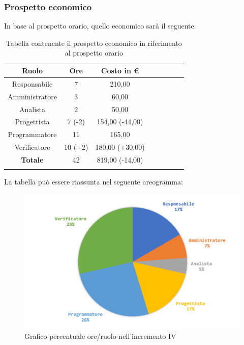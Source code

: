 		\subsubsection{Prospetto economico}
			In base al prospetto orario, quello economico sarà il seguente: 
			
			\begin{longtable}{|c|c|c|c|c|c|c|c}
				\hline
				\rowcolor{lighter-grayer}
				\textbf{Ruolo} & \textbf{Ore} & \textbf{Costo in €} \\
				\hline
				\endfirsthead
				\hline
			Responsabile 	    & 7 & 210,00\\
			\hline 
			\hline
			Amministratore	  & 3 & 60,00\\
			\hline
			\hline
			Analista 				& 2 & 50,00\\
			\hline
			\hline
			Progettista 		  & 7 (-2) & 154,00 (-44,00)\\
			\hline
			\hline
			Programmatore 	 & 11 & 165,00\\
			\hline
			\hline
			Verificatore 		  & 10 (+2) & 180,00 (+30,00) \\
			\hline
			\textbf{Totale} 	& 42 & 819,00 (-14,00)\\
			\hline
				
				\caption{Tabella contenente il prospetto economico in riferimento al prospetto orario}
			\end{longtable}
			
			La tabella può essere riassunta nel seguente areogramma:
			\begin{figure}[H]
				\centering
				\includegraphics[width=0.8\linewidth]{images/consuntivo/ConsIncr4-2.png}
				\caption{Grafico percentuale ore/ruolo nell'incremento IV}
				\label{fig:consuntivo grafico costi ruolo incremento IV}
			\end{figure}
			\pagebreak	
		


